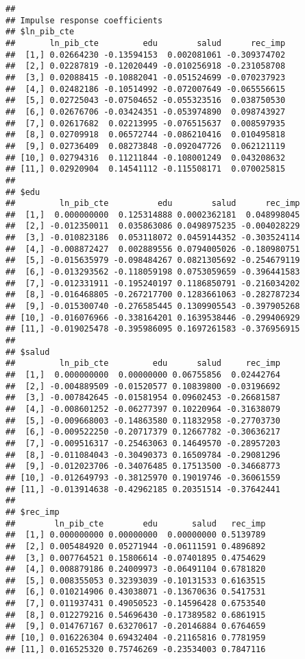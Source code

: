 \documentclass[]{book}
\theoremstyle{definition}
\theoremstyle{definition}
\theoremstyle{definition}
\theoremstyle{remark}
\begin{document}
\begin{verbatim}
## 
## Impulse response coefficients
## $ln_pib_cte
##       ln_pib_cte         edu        salud      rec_imp
##  [1,] 0.02664230 -0.13594153  0.002081061 -0.309374702
##  [2,] 0.02287819 -0.12020449 -0.010256918 -0.231058708
##  [3,] 0.02088415 -0.10882041 -0.051524699 -0.070237923
##  [4,] 0.02482186 -0.10514992 -0.072007649 -0.065556615
##  [5,] 0.02725043 -0.07504652 -0.055323516  0.038750530
##  [6,] 0.02676706 -0.03424351 -0.053974890  0.098743927
##  [7,] 0.02617682  0.02213995 -0.076515637  0.008597935
##  [8,] 0.02709918  0.06572744 -0.086210416  0.010495818
##  [9,] 0.02736409  0.08273848 -0.092047726  0.062121119
## [10,] 0.02794316  0.11211844 -0.108001249  0.043208632
## [11,] 0.02920904  0.14541112 -0.115508171  0.070025815
## 
## $edu
##         ln_pib_cte          edu        salud      rec_imp
##  [1,]  0.000000000  0.125314888 0.0002362181  0.048998045
##  [2,] -0.012350011  0.035863086 0.0498975235 -0.004028229
##  [3,] -0.010823186  0.053118072 0.0459144352 -0.303524114
##  [4,] -0.008872427  0.002889556 0.0794005026 -0.180980751
##  [5,] -0.015635979 -0.098484267 0.0821305692 -0.254679119
##  [6,] -0.013293562 -0.118059198 0.0753059659 -0.396441583
##  [7,] -0.012331911 -0.195240197 0.1186850791 -0.216034202
##  [8,] -0.016468805 -0.267217700 0.1283661063 -0.282787234
##  [9,] -0.015300740 -0.276585445 0.1309905543 -0.397905268
## [10,] -0.016076966 -0.338164201 0.1639538446 -0.299406929
## [11,] -0.019025478 -0.395986095 0.1697261583 -0.376956915
## 
## $salud
##         ln_pib_cte         edu      salud     rec_imp
##  [1,]  0.000000000  0.00000000 0.06755856  0.02442764
##  [2,] -0.004889509 -0.01520577 0.10839800 -0.03196692
##  [3,] -0.007842645 -0.01581954 0.09602453 -0.26681587
##  [4,] -0.008601252 -0.06277397 0.10220964 -0.31638079
##  [5,] -0.009668003 -0.14863580 0.11832958 -0.27703730
##  [6,] -0.009522250 -0.20717379 0.12667782 -0.30636217
##  [7,] -0.009516317 -0.25463063 0.14649570 -0.28957203
##  [8,] -0.011084043 -0.30490373 0.16509784 -0.29081296
##  [9,] -0.012023706 -0.34076485 0.17513500 -0.34668773
## [10,] -0.012649793 -0.38125970 0.19019746 -0.36061559
## [11,] -0.013914638 -0.42962185 0.20351514 -0.37642441
## 
## $rec_imp
##        ln_pib_cte        edu       salud   rec_imp
##  [1,] 0.000000000 0.00000000  0.00000000 0.5139789
##  [2,] 0.005484920 0.05271944 -0.06111591 0.4896892
##  [3,] 0.007764521 0.15806614 -0.07401895 0.4754629
##  [4,] 0.008879186 0.24009973 -0.06491104 0.6781820
##  [5,] 0.008355053 0.32393039 -0.10131533 0.6163515
##  [6,] 0.010214906 0.43038071 -0.13670636 0.5417531
##  [7,] 0.011937431 0.49050523 -0.14596428 0.6753540
##  [8,] 0.012279216 0.54696430 -0.17389582 0.6861915
##  [9,] 0.014767167 0.63270617 -0.20146884 0.6764659
## [10,] 0.016226304 0.69432404 -0.21165816 0.7781959
## [11,] 0.016525320 0.75746269 -0.23534003 0.7847116
\end{verbatim}
\end{document}
